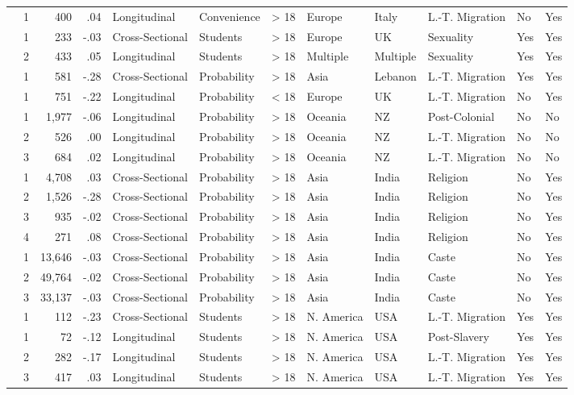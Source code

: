 \documentclass[10pt, letterpaper]{article}
\begin{document}
\begin{landscape}
\begin{xltabular}{650pt}{Xrrrllrlllll}
\cite{2391} & 1 & 400 & .04 & Longitudinal & Convenience & > 18 & Europe & Italy & L.-T. Migration & No & Yes\\
\cite{956} & 1 & 233 & -.03 & Cross-Sectional & Students & > 18 & Europe & UK & Sexuality & Yes & Yes\\
 & 2 & 433 & .05 & Longitudinal & Students & > 18 & Multiple & Multiple & Sexuality & Yes & Yes\\
\cite{1114} & 1 & 581 & -.28 & Cross-Sectional & Probability & > 18 & Asia & Lebanon & L.-T. Migration & Yes & Yes\\
\cite{2382} & 1 & 751 & -.22 & Longitudinal & Probability & < 18 & Europe & UK & L.-T. Migration & No & Yes\\
\cite{2381} & 1 & 1,977 & -.06 & Longitudinal & Probability & > 18 & Oceania & NZ & Post-Colonial & No & No\\
 & 2 & 526 & .00 & Longitudinal & Probability & > 18 & Oceania & NZ & L.-T. Migration & No & No\\
 & 3 & 684 & .02 & Longitudinal & Probability & > 18 & Oceania & NZ & L.-T. Migration & No & No\\
\cite{2385} & 1 & 4,708 & .03 & Cross-Sectional & Probability & > 18 & Asia & India & Religion & No & Yes\\
 & 2 & 1,526 & -.28 & Cross-Sectional & Probability & > 18 & Asia & India & Religion & No & Yes\\
 & 3 & 935 & -.02 & Cross-Sectional & Probability & > 18 & Asia & India & Religion & No & Yes\\
 & 4 & 271 & .08 & Cross-Sectional & Probability & > 18 & Asia & India & Religion & No & Yes\\
\cite{2392} & 1 & 13,646 & -.03 & Cross-Sectional & Probability & > 18 & Asia & India & Caste & No & Yes\\
 & 2 & 49,764 & -.02 & Cross-Sectional & Probability & > 18 & Asia & India & Caste & No & Yes\\
 & 3 & 33,137 & -.03 & Cross-Sectional & Probability & > 18 & Asia & India & Caste & No & Yes\\
\cite{2375} & 1 & 112 & -.23 & Cross-Sectional & Students & > 18 & N. America & USA & L.-T. Migration & Yes & Yes\\
\cite{1743} & 1 & 72 & -.12 & Longitudinal & Students & > 18 & N. America & USA & Post-Slavery & Yes & Yes\\
 & 2 & 282 & -.17 & Longitudinal & Students & > 18 & N. America & USA & L.-T. Migration & Yes & Yes\\
 & 3 & 417 & .03 & Longitudinal & Students & > 18 & N. America & USA & L.-T. Migration & Yes & Yes\\
 

\end{xltabular}
\end{landscape}
\end{document}
